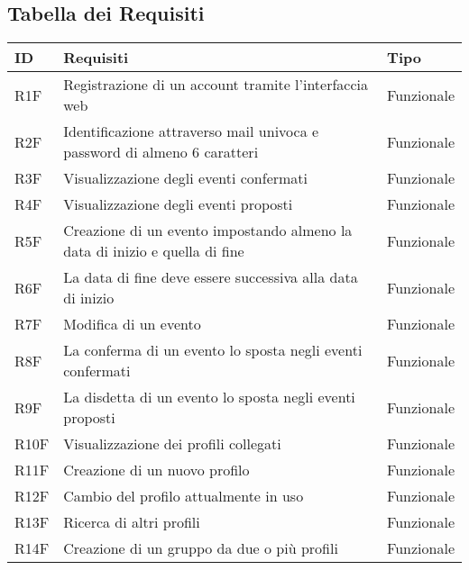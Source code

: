 \subsection{Tabella dei Requisiti}

\begin{tabular} {|P{1.5cm}|P{12.5cm}|P{3cm}|}
  \hline
  \textbf{ID} & \textbf{Requisiti}                                                          & \textbf{Tipo}  \\
  \hline
  R1F         & Registrazione di un account tramite l’interfaccia web                       & Funzionale     \\
  \hline
  R2F         & Identificazione attraverso mail univoca e password di almeno 6 caratteri    & Funzionale     \\
  \hline
  R3F         & Visualizzazione degli eventi confermati                                     & Funzionale     \\
  \hline
  R4F         & Visualizzazione degli eventi proposti                                       & Funzionale     \\
  \hline
  R5F         & Creazione di un evento impostando almeno la data di inizio e quella di fine & Funzionale     \\
  \hline
  R6F         & La data di fine deve essere successiva alla data di inizio                  & Funzionale     \\
  \hline
  R7F         & Modifica di un evento                                                       & Funzionale     \\
  \hline
  R8F         & La conferma di un evento lo sposta negli eventi confermati                  & Funzionale     \\
  \hline
  R9F         & La disdetta di un evento lo sposta negli eventi proposti                    & Funzionale     \\
  \hline
  R10F        & Visualizzazione dei profili collegati                                       & Funzionale     \\
  \hline
  R11F        & Creazione di un nuovo profilo                                               & Funzionale     \\
  \hline
  R12F        & Cambio del profilo attualmente in uso                                       & Funzionale     \\
  \hline
  R13F        & Ricerca di altri profili                                                    & Funzionale     \\
  \hline
  R14F        & Creazione di un gruppo da due o più profili                                 & Funzionale     \\

\end{tabular}
